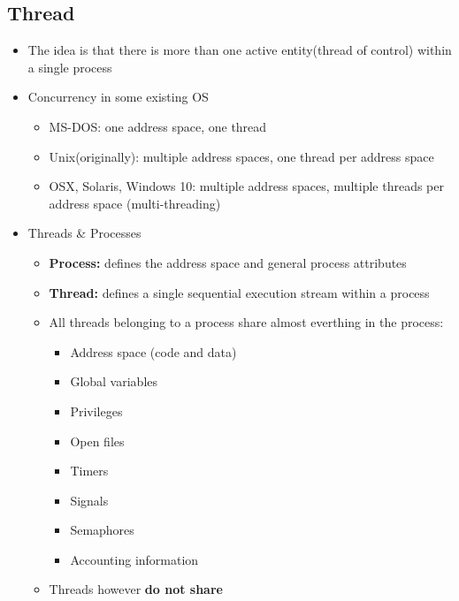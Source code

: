 \documentclass[11pt]{article}
\theoremstyle{definition}
\begin{document}
        \subsection{Thread}
            \begin{itemize}
                \item The idea is that there is more than one active entity(thread of control) within a single process
                \item Concurrency in some existing OS 
                \begin{itemize}
                    \item MS-DOS: one address space, one thread
                    \item Unix(originally): multiple address spaces, one thread per address space
                    \item OSX, Solaris, Windows 10: multiple address spaces, multiple threads per address space (multi-threading)
                \end{itemize}
                \item Threads \& Processes
                \begin{itemize}
                    \item  \textbf{Process:} defines the address space and general process attributes 
                    \item \textbf{Thread:} defines a single sequential execution stream within a process 
                    \item All threads belonging to a process share almost everthing in the process:
                    \begin{itemize}
                        \item Address space (code and data)
                        \item Global variables
                        \item Privileges
                        \item Open files
                        \item Timers
                        \item Signals
                        \item Semaphores
                        \item Accounting information
                    \end{itemize}
                    \item Threads however \textbf{do not share}
                    \begin{itemize}

\end{itemize}
\end{itemize}
\end{itemize}
\end{document}
